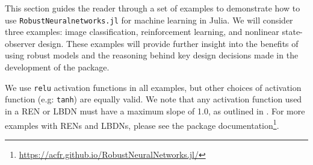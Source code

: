 This section guides the reader through a set of examples to demonstrate how to use \verb|RobustNeuralnetworks.jl| for machine learning in Julia. We will consider three examples: image classification, reinforcement learning, and nonlinear state-observer design. These examples will provide further insight into the benefits of using robust models and the reasoning behind key design decisions made in the development of the package.

We use \verb|relu| activation functions in all examples, but other choices of activation function (e.g: \verb|tanh|) are equally valid. We note that any activation function used in a REN or LBDN must have a maximum slope of 1.0, as outlined in \cite{Revay++2023,Wang+Manchester2023}. For more examples with RENs and LBDNs, please see the package documentation\footnote{\url{https://acfr.github.io/RobustNeuralNetworks.jl/}}.